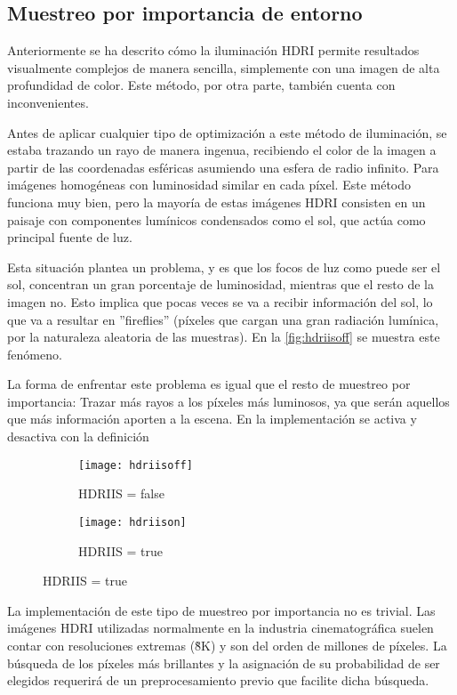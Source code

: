 \subsection{Muestreo por importancia de entorno}
	
Anteriormente se ha descrito cómo la iluminación HDRI permite resultados visualmente complejos de manera sencilla, simplemente con una imagen de alta profundidad de color. Este método, por otra parte, también cuenta con inconvenientes. 

Antes de aplicar cualquier tipo de optimización a este método de iluminación, se estaba trazando un rayo de manera ingenua, recibiendo el color de la imagen a partir de las coordenadas esféricas asumiendo una esfera de radio infinito. Para imágenes homogéneas con luminosidad similar en cada píxel. Este método funciona muy bien, pero la mayoría de estas imágenes HDRI consisten en un paisaje con componentes lumínicos condensados como el sol, que actúa como principal fuente de luz.

Esta situación plantea un problema, y es que los focos de luz como puede ser el sol, concentran un gran porcentaje de luminosidad, mientras que el resto de la imagen no. Esto implica que pocas veces se va a recibir información del sol, lo que va a resultar en ''fireflies'' (píxeles que cargan una gran radiación lumínica, por la naturaleza aleatoria de las muestras). En la \autoref{fig:hdriisoff} se muestra este fenómeno.

La forma de enfrentar este problema es igual que el resto de muestreo por importancia: Trazar más rayos a los píxeles más luminosos, ya que serán aquellos que más información aporten a la escena. En la implementación se activa y desactiva con la definición 

\begin{figure}[H]
\label{fig:hdriis}
	\centering
  \begin{subfigure}[b]{0.4\textwidth}
	\texttt{[image: hdriisoff]}
	\caption{HDRIIS = false}
	\label{fig:hdriisoff}
  \end{subfigure}
  \hfill
  \begin{subfigure}[b]{0.4\textwidth}
	\texttt{[image: hdriison]}
	\caption{HDRIIS = true}
	\label{fig:hdriison}
  \end{subfigure}
\end{figure}

La implementación de este tipo de muestreo por importancia no es trivial. Las imágenes HDRI utilizadas normalmente en la industria cinematográfica suelen contar con resoluciones extremas (\~8K) y son del orden de millones de píxeles. La búsqueda de los píxeles más brillantes y la asignación de su probabilidad de ser elegidos requerirá de un preprocesamiento previo que facilite dicha búsqueda.

